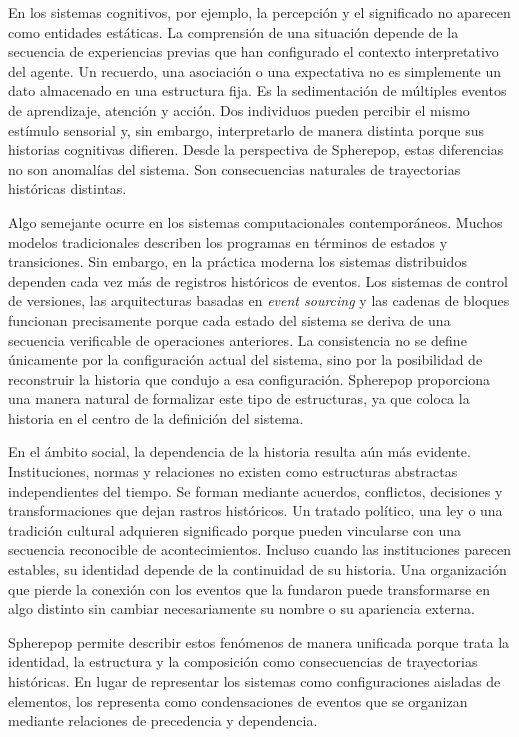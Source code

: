 \documentclass[12pt]{article}
\begin{document}
En los sistemas cognitivos, por ejemplo, la percepción y el significado no aparecen como entidades estáticas. La comprensión de una situación depende de la secuencia de experiencias previas que han configurado el contexto interpretativo del agente. Un recuerdo, una asociación o una expectativa no es simplemente un dato almacenado en una estructura fija. Es la sedimentación de múltiples eventos de aprendizaje, atención y acción. Dos individuos pueden percibir el mismo estímulo sensorial y, sin embargo, interpretarlo de manera distinta porque sus historias cognitivas difieren. Desde la perspectiva de Spherepop, estas diferencias no son anomalías del sistema. Son consecuencias naturales de trayectorias históricas distintas.

Algo semejante ocurre en los sistemas computacionales contemporáneos. Muchos modelos tradicionales describen los programas en términos de estados y transiciones. Sin embargo, en la práctica moderna los sistemas distribuidos dependen cada vez más de registros históricos de eventos. Los sistemas de control de versiones, las arquitecturas basadas en \emph{event sourcing} y las cadenas de bloques funcionan precisamente porque cada estado del sistema se deriva de una secuencia verificable de operaciones anteriores. La consistencia no se define únicamente por la configuración actual del sistema, sino por la posibilidad de reconstruir la historia que condujo a esa configuración. Spherepop proporciona una manera natural de formalizar este tipo de estructuras, ya que coloca la historia en el centro de la definición del sistema.

En el ámbito social, la dependencia de la historia resulta aún más evidente. Instituciones, normas y relaciones no existen como estructuras abstractas independientes del tiempo. Se forman mediante acuerdos, conflictos, decisiones y transformaciones que dejan rastros históricos. Un tratado político, una ley o una tradición cultural adquieren significado porque pueden vincularse con una secuencia reconocible de acontecimientos. Incluso cuando las instituciones parecen estables, su identidad depende de la continuidad de su historia. Una organización que pierde la conexión con los eventos que la fundaron puede transformarse en algo distinto sin cambiar necesariamente su nombre o su apariencia externa.

Spherepop permite describir estos fenómenos de manera unificada porque trata la identidad, la estructura y la composición como consecuencias de trayectorias históricas. En lugar de representar los sistemas como configuraciones aisladas de elementos, los representa como condensaciones de eventos que se organizan mediante relaciones de precedencia y dependencia.
\end{document}
